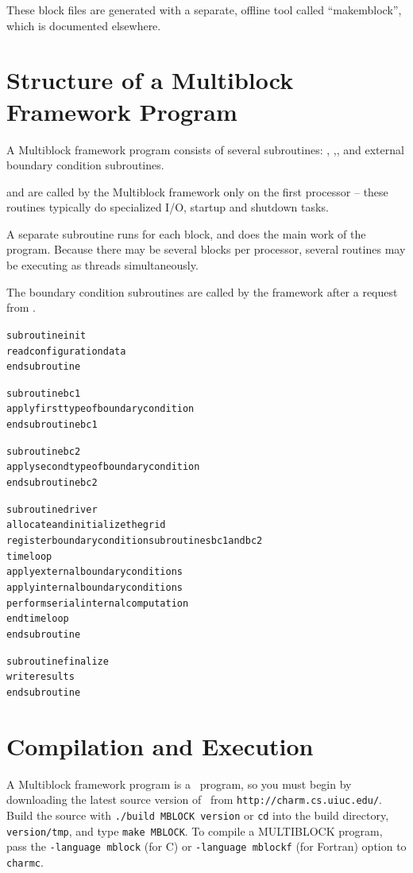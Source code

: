 \documentclass[10pt]{article}
\begin{document}
These block files are generated with a separate, offline tool
called ``makemblock'', which is documented elsewhere.

\section{Structure of a Multiblock Framework Program}

A Multiblock framework program consists of several subroutines: , ,, and external boundary condition subroutines.  

 and  are called by the Multiblock framework only on the first processor -- these routines typically do specialized I/O, startup and shutdown tasks.  

A separate  subroutine runs for each block, and does the main work of the program.  Because there may be several blocks per processor, several  routines may be executing as threads simultaneously.  

The boundary condition subroutines are called by the framework after a 
request from .


\begin{alltt}
     subroutine init
          read configuration data
     end subroutine

     subroutine bc1
          apply first type of boundary condition
     end subroutine bc1

     subroutine bc2
          apply second type of boundary condition
     end subroutine bc2

     subroutine driver
          allocate and initialize the grid
          register boundary condition subroutines bc1 and bc2
          time loop
               apply external boundary conditions
               apply internal boundary conditions
               perform serial internal computation
          end time loop
     end subroutine

     subroutine finalize
           write results
     end subroutine
\end{alltt}



\section{Compilation and Execution}

A Multiblock framework program is a \charmpp\ program, so you must begin by
downloading the latest source version of \charmpp\ from
{\tt http://charm.cs.uiuc.edu/}.  Build the source with 
{\tt ./build MBLOCK version} or {\tt cd} into the build directory, 
{\tt version/tmp}, and type {\tt make MBLOCK}.
To compile a MULTIBLOCK program, pass the {\tt -language mblock} (for C) or 
{\tt -language mblockf} (for Fortran) option to {\tt charmc}.
\end{document}
